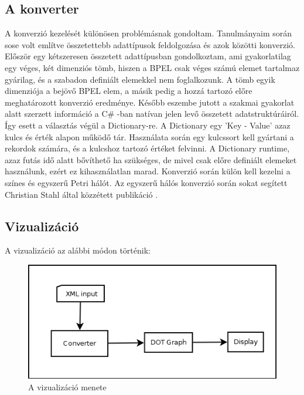 \subsection{A konverter }
A konverzió kezelését különösen problémásnak gondoltam. Tanulmányaim során sose volt említve összetettebb adattípusok feldolgozása és azok közötti konverzió. Először egy kétszeresen összetett adattípusban gondolkoztam, ami gyakorlatilag egy véges, két dimenziós tömb, hiszen a BPEL csak véges számú elemet tartalmaz gyárilag, és a szabadon definiált elemekkel nem foglalkozunk. A tömb egyik dimenziója a bejövő BPEL elem, a másik pedig a hozzá tartozó előre meghatározott konverzió eredménye. Később eszembe jutott a szakmai gyakorlat alatt szerzett információ a C\# -ban natívan jelen levő összetett adatstruktúráiról. Így esett a választás végül a Dictionary-re. A Dictionary egy 'Key - Value' azaz kulcs és érték alapon működő tár. Használata során egy kulcssort kell gyártani a rekordok számára, és a kulcshoz tartozó értéket felvinni. A Dictionary runtime, azaz futás idő alatt bővíthető ha szükséges, de mivel csak előre definiált elemeket használunk, ezért ez kihasználatlan marad. Konverzió során külön kell kezelni a színes és egyszerű Petri hálót. Az egyszerű hálós konverzió során sokat segített Christian Stahl által közzétett publikáció \cite{bpelToPnet}.

\subsection{Vizualizáció}
A vizualizáció az alábbi módon történik:
\begin{figure}[h!]
\centering
\includegraphics[scale=0.6]{images/graphdisplay.png}
\caption{A vizualizáció menete}
\label{fig:graphdisplay}
\end{figure}

